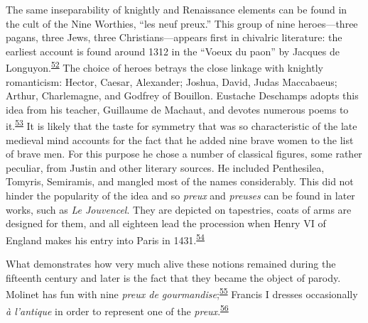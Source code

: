 The same inseparability of knightly and Renaissance elements can be
found in the cult of the Nine Worthies, ``les neuf preux.'' This group
of nine heroes---three pagans, three Jews, three Christians---appears
first in chivalric literature: the earliest account is found around 1312
in the ``Voeux du paon'' by Jacques de
Longuyon.\textsuperscript{\protect\hypertarget{10_Chapter_Three__THE_HEROIC_DREAM.xhtmlux5cux23id_1829}{\protect\hyperlink{23_NOTES.xhtmlux5cux23id_1830}{52}}}
The choice of heroes betrays the close linkage with knightly
romanticism: Hector, Caesar, Alexander; Joshua, David, Judas Maccabaeus;
Arthur, Charlemagne, and Godfrey of Bouillon. Eustache Deschamps adopts
this idea from his teacher, Guillaume de Machaut, and devotes numerous
poems to
it.\textsuperscript{\protect\hypertarget{10_Chapter_Three__THE_HEROIC_DREAM.xhtmlux5cux23id_1827}{\protect\hyperlink{23_NOTES.xhtmlux5cux23id_1828}{53}}}
It is likely that the
\protect\hypertarget{10_Chapter_Three__THE_HEROIC_DREAM.xhtmlux5cux23page_77}{}{}taste
for symmetry that was so characteristic of the late medieval mind
accounts for the fact that he added nine brave women to the list of
brave men. For this purpose he chose a number of classical figures, some
rather peculiar, from Justin and other literary sources. He included
Penthesilea, Tomyris, Semiramis, and mangled most of the names
considerably. This did not hinder the popularity of the idea and so
\emph{preux} and \emph{preuses} can be found in later works, such as
\emph{Le Jouvencel}. They are depicted on tapestries, coats of arms are
designed for them, and all eighteen lead the procession when Henry VI of
England makes his entry into Paris in
1431.\textsuperscript{\protect\hypertarget{10_Chapter_Three__THE_HEROIC_DREAM.xhtmlux5cux23id_1825}{\protect\hyperlink{23_NOTES.xhtmlux5cux23id_1826}{54}}}

What demonstrates how very much alive these notions remained during the
fifteenth century and later is the fact that they became the object of
parody. Molinet has fun with nine \emph{preux de
gourmandise};\textsuperscript{\protect\hypertarget{10_Chapter_Three__THE_HEROIC_DREAM.xhtmlux5cux23id_1823}{\protect\hyperlink{23_NOTES.xhtmlux5cux23id_1824}{55}}}
Francis I dresses occasionally \emph{à l'antique} in order to represent
one of the
\emph{preux}.\textsuperscript{\protect\hypertarget{10_Chapter_Three__THE_HEROIC_DREAM.xhtmlux5cux23id_1821}{\protect\hyperlink{23_NOTES.xhtmlux5cux23id_1822}{56}}}

